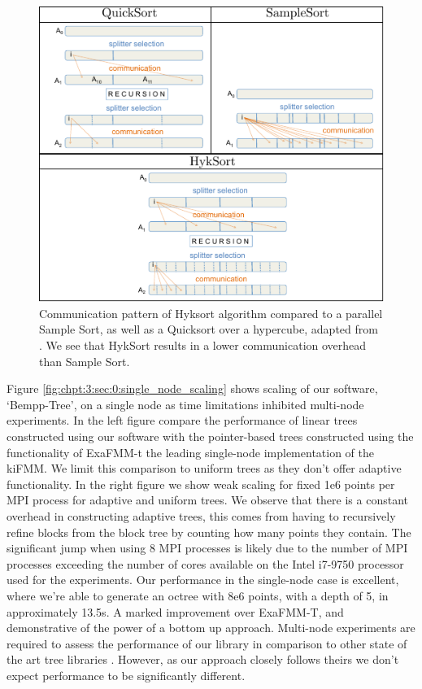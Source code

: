 \begin{figure}
    \centerline{\includegraphics[width=0.7\linewidth]{images/ch_3/hyksort.pdf}}
    \caption{Communication pattern of Hyksort algorithm compared to a parallel Sample Sort, as well as a Quicksort over a hypercube, adapted from \cite{sundar2013hyksort}. We see that HykSort results in a lower communication overhead than Sample Sort.}
    \label{fig:chpt:3:sec:0:hyksort}
\end{figure}


Figure \ref{fig:chpt:3:sec:0:single_node_scaling} shows scaling of our software, `Bempp-Tree', on a single node as time limitations inhibited multi-node experiments. In the left figure compare the performance of linear trees constructed using our software with the pointer-based trees constructed using the functionality of ExaFMM-t the leading single-node implementation of the kiFMM. We limit this comparison to uniform trees as they don't offer adaptive functionality. In the right figure we show weak scaling for fixed 1e6 points per MPI process for adaptive and uniform trees. We observe that there is a constant overhead in constructing adaptive trees, this comes from having to recursively refine blocks from the block tree by counting how many points they contain. The significant jump when using 8 MPI processes is likely due to the number of MPI processes exceeding the number of cores available on the Intel i7-9750 processor used for the experiments. Our performance in the single-node case is excellent, where we're able to generate an octree with 8e6 points, with a depth of 5, in approximately 13.5s. A marked improvement over ExaFMM-T, and demonstrative of the power of a bottom up approach. Multi-node experiments are required to assess the performance of our library in comparison to other state of the art tree libraries \cite{sampath2008dendro,BursteddeWilcoxGhattas11}. However, as our approach closely follows theirs we don't expect performance to be significantly different.

